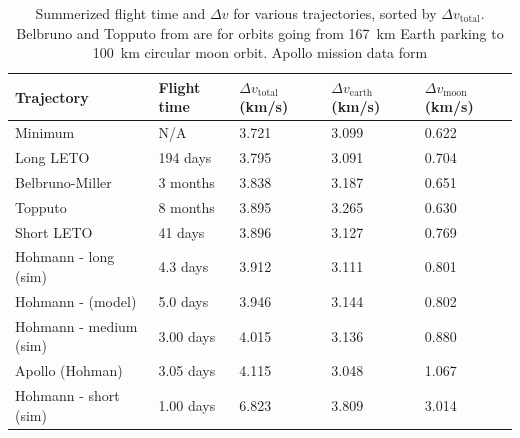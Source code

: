 \begin{table}
    \begin{tabular}{|l|l|l|l|l|}
    \hline
    Trajectory                    & Flight time             & $\Delta v_{\text{total}}$ (\scriptsize{km/s)} & $\Delta v_{\text{earth}}$ (\scriptsize{km/s)} & $\Delta v_{\text{moon}}$ (\scriptsize{km/s)} \\ \hline
    Minimum                       & N/A                     & 3.721                     & 3.099                     & 0.622                    \\ \hline
    Long LETO                     & 194 days  & 3.795                     & 3.091                     & 0.704                    \\ \hline
    Belbruno-Miller               & 3 months                & 3.838                     & 3.187                     & 0.651                    \\ \hline
    Topputo                       & 8 months                & 3.895                     & 3.265                     & 0.630                    \\ \hline
    Short LETO                    & 41 days                 & 3.896                     & 3.127                     & 0.769                    \\ \hline
    Hohmann - long (sim)   & 4.3 days                & 3.912                     & 3.111                     & 0.801                    \\ \hline
    Hohmann - (model)      & 5.0 days                & 3.946                     & 3.144                     & 0.802                    \\ \hline
    Hohmann - medium (sim) & 3.00 days               & 4.015                     & 3.136                     & 0.880                    \\ \hline
    Apollo (Hohman)      & 3.05 days               & 4.115                     & 3.048                     & 1.067                    \\ \hline
    Hohmann - short (sim)  & 1.00 days               & 6.823                     & 3.809                     & 3.014                    \\ \hline
\end{tabular}
\caption{Summerized flight time and $\Delta v$ for various trajectories, sorted by $\Delta v_{\text{total}}$. Belbruno and Topputo from \cite{Juul2008} are for orbits going from \SI{167}{\km} Earth parking to \SI{100}{\km} circular moon orbit. Apollo mission data form \cite{NASA1966} \cite{apollo-timeline}}
\label{tab:results}
\end{table}
